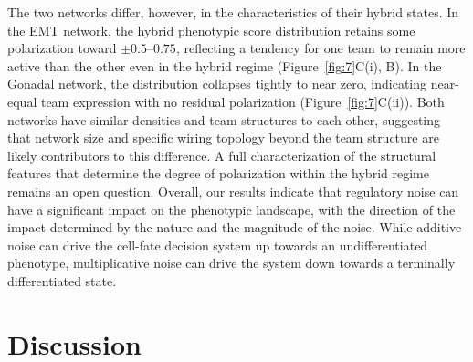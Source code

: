 \documentclass[11pt]{article}
\begin{document}
The two networks differ, however, in the characteristics of their hybrid states. In the EMT network, the hybrid phenotypic score distribution retains some polarization toward $\pm 0.5$--$0.75$, reflecting a tendency for one team to remain more active than the other even in the hybrid regime (Figure~\ref{fig:7}C(i), B). In the Gonadal network, the distribution collapses tightly to near zero, indicating near-equal team expression with no residual polarization (Figure~\ref{fig:7}C(ii)). Both networks have similar densities and team structures to each other, suggesting that network size and specific wiring topology beyond the team structure are likely contributors to this difference. A full characterization of the structural features that determine the degree of polarization within the hybrid regime remains an open question. Overall, our results indicate that regulatory noise can have a significant impact on the phenotypic landscape, with the direction of the impact determined by the nature and the magnitude of the noise. While additive noise can drive the cell-fate decision system up towards an undifferentiated phenotype, multiplicative noise can drive the system down towards a terminally differentiated state. 

\section{Discussion}
\end{document}
